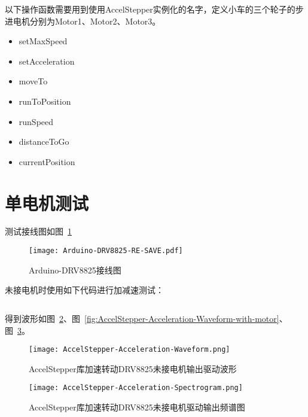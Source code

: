 以下操作函数需要用到使用AccelStepper实例化的名字，定义小车的三个轮子的步进电机分别为Motor1、Motor2、Motor3。

\begin{itemize}
    \item setMaxSpeed
    \item setAcceleration
    \item moveTo
    \item runToPosition
    \item runSpeed
    \item distanceToGo
    \item currentPosition
\end{itemize}


\section{单电机测试}

测试接线图如图~\ref{fig:Arduino-DRV8825}

\begin{figure}[htbp]
    \centering
    \texttt{[image: Arduino-DRV8825-RE-SAVE.pdf]}
    \caption{Arduino-DRV8825接线图}
    \label{fig:Arduino-DRV8825}
\end{figure}



未接电机时使用如下代码进行加减速测试：

\inputminted[mathescape, linenos, breaklines]{C}{Code/Stepper-3/Stepper-3.ino}

得到波形如图~\ref{fig:AccelStepper-Acceleration-Waveform}、图~\ref{fig:AccelStepper-Acceleration-Waveform-with-motor}、图~\ref{fig:AccelStepper-Acceleration-Spectrogram}。

\begin{figure}[htbp]
    \centering
    \texttt{[image: AccelStepper-Acceleration-Waveform.png]}
    \caption{AccelStepper库加速转动DRV8825未接电机输出驱动波形}
    \label{fig:AccelStepper-Acceleration-Waveform}
\end{figure}

\begin{figure}[htbp]
    \centering
    \texttt{[image: AccelStepper-Acceleration-Spectrogram.png]}
    \caption{AccelStepper库加速转动DRV8825未接电机驱动输出频谱图}
    \label{fig:AccelStepper-Acceleration-Spectrogram}
\end{figure}

